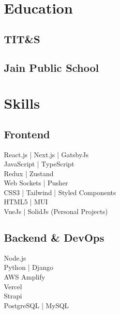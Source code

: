 \documentclass[]{deedy-resume-reversed}
\begin{document}
\begin{minipage}[t]{0.30\textwidth}


\section{Education}

\subsection{TIT\&S}
\sectionsep

\subsection{Jain Public School}
\sectionsep


\section{Skills}
\subsection{Frontend}
\textbullet{} React.js | Next.js | GatsbyJs \\ \textbullet{} JavaScript | TypeScript \\ \textbullet{} Redux | Zustand \\ \textbullet{} Web Sockets | Pusher \\ \textbullet{} CSS3 | Tailwind | Styled Components \\ \textbullet{} HTML5 | MUI \\ \textbullet{} VueJs | SolidJs (Personal Projects)
\sectionsep

\subsection{Backend \& DevOps}
\textbullet{} Node.js \\ \textbullet{} Python | Django \\ \textbullet{} AWS Amplify \\ \textbullet{} Vercel \\ \textbullet{} Strapi \\ \textbullet{} PostgreSQL | MySQL
\sectionsep


\end{minipage}
\end{document}

